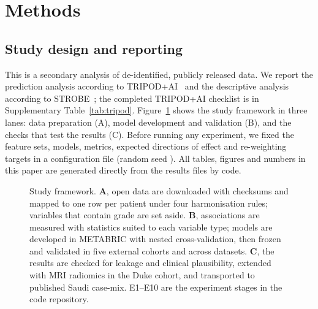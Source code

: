 \section{Methods}\label{sec:methods}

\subsection{Study design and reporting}
This is a secondary analysis of de-identified, publicly released data. We report the prediction
analysis according to TRIPOD+AI~\citep{collins2024tripodai} and the descriptive analysis according to
STROBE~\citep{vonelm2007strobe}; the completed TRIPOD+AI checklist is in Supplementary
Table~\ref{tab:tripod}. Figure~\ref{fig:framework} shows the study framework in three lanes: data
preparation (A), model development and validation (B), and the checks that test the results (C).
Before running any experiment, we fixed the feature sets, models, metrics, expected directions of
effect and re-weighting targets in a configuration file (random seed \Seed). All tables, figures
and numbers in this paper are generated directly from the results files by code.

\begin{figure}[t]\centering
\resizebox{\linewidth}{!}{}
\caption{Study framework. \textbf{A}, open data are downloaded with checksums and mapped to one row
per patient under four harmonisation rules; variables that contain grade are set aside.
\textbf{B}, associations are measured with statistics suited to each variable type; models are
developed in METABRIC with nested cross-validation, then frozen and validated in five external
cohorts and across datasets. \textbf{C}, the results are checked for leakage and clinical
plausibility, extended with MRI radiomics in the Duke cohort, and transported to published Saudi
case-mix. E1--E10 are the experiment stages in the code repository.}\label{fig:framework}
\end{figure}

